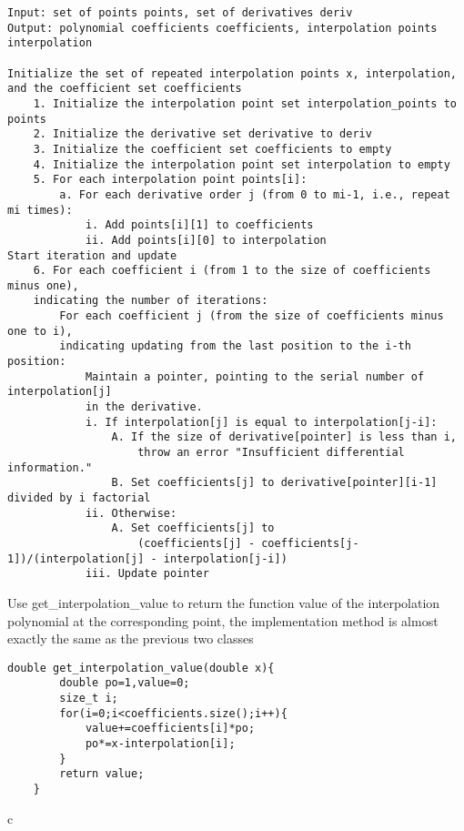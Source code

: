 \documentclass[a4paper]{article}
\begin{document}
\begin{verbatim}
Input: set of points points, set of derivatives deriv
Output: polynomial coefficients coefficients, interpolation points interpolation

Initialize the set of repeated interpolation points x, interpolation, 
and the coefficient set coefficients
    1. Initialize the interpolation point set interpolation_points to points
    2. Initialize the derivative set derivative to deriv
    3. Initialize the coefficient set coefficients to empty
    4. Initialize the interpolation point set interpolation to empty
    5. For each interpolation point points[i]:
        a. For each derivative order j (from 0 to mi-1, i.e., repeat mi times):
            i. Add points[i][1] to coefficients
            ii. Add points[i][0] to interpolation
Start iteration and update   
    6. For each coefficient i (from 1 to the size of coefficients minus one), 
    indicating the number of iterations:    
        For each coefficient j (from the size of coefficients minus one to i),
        indicating updating from the last position to the i-th position:
            Maintain a pointer, pointing to the serial number of interpolation[j] 
            in the derivative.
            i. If interpolation[j] is equal to interpolation[j-i]:
                A. If the size of derivative[pointer] is less than i, 
                    throw an error "Insufficient differential information."
                B. Set coefficients[j] to derivative[pointer][i-1] divided by i factorial
            ii. Otherwise:
                A. Set coefficients[j] to 
                    (coefficients[j] - coefficients[j-1])/(interpolation[j] - interpolation[j-i])
            iii. Update pointer
\end{verbatim}

Use get\_interpolation\_value to return the function value of the interpolation polynomial at the corresponding point, the implementation method is almost exactly the same as the previous two classes \\
\begin{verbatim}
double get_interpolation_value(double x){
        double po=1,value=0;
        size_t i;
        for(i=0;i<coefficients.size();i++){
            value+=coefficients[i]*po;
            po*=x-interpolation[i];
        }
        return value;
    }
\end{verbatim}
c
\end{document}

